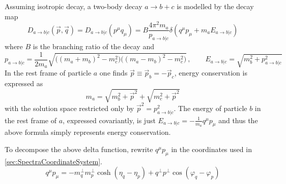 Assuming isotropic decay, a two-body decay $a\rightarrow b+c$ is modelled by the decay map 
\begin{equation}
    D_{a\rightarrow b\vert c}(\vec{p},\vec{q})=D_{a\rightarrow b\vert c}(p^\mu q_\mu)=B\frac{4\pi^2 m_a}{p_{a\rightarrow b\vert c}}\delta(q^\mu p_\mu+m_a E_{a\rightarrow b\vert c})
\end{equation}
where $B$ is the branching ratio of the decay and
\begin{equation}
    p_{a\rightarrow b\vert c}=\frac{1}{2m_a}\sqrt{\big((m_a+m_b)^2-m_c^2\big)\big((m_a-m_b)^2-m_c^2\big)}\,,\qquad E_{a\rightarrow b\vert c}=\sqrt{m_b^2+p_{a\rightarrow b\vert c}^2}
\end{equation}
In the rest frame of particle $a$ one finds $\vec{p}\equiv \vec{p}_b=-\vec{p}_c$, energy conservation is expressed as
\begin{equation}
    m_a=\sqrt{m_b^2+\vec{p}^2}+\sqrt{m_c^2+\vec{p}^2}
\end{equation}
with the solution space restricted only by $\vec{p}^2=p_{a\rightarrow b\vert c}^2$. The energy of particle $b$ in the rest frame of $a$, expressed covariantly, is just $E_{a\rightarrow b\vert c}=-\frac{1}{m_a}q^\mu p_\mu$ and thus the above formula simply represents energy conservation.

To decompose the above delta function, rewrite $q^\mu p_\mu$ in the coordinates used in \ref{sec:SpectraCoordinateSystem}.
\begin{equation}
    q^\mu p_\mu=-m_q^\perp m_p^\perp\cosh(\eta_q-\eta_p)+q^\perp p^\perp\cos(\varphi_q-\varphi_p)
\end{equation}
    
